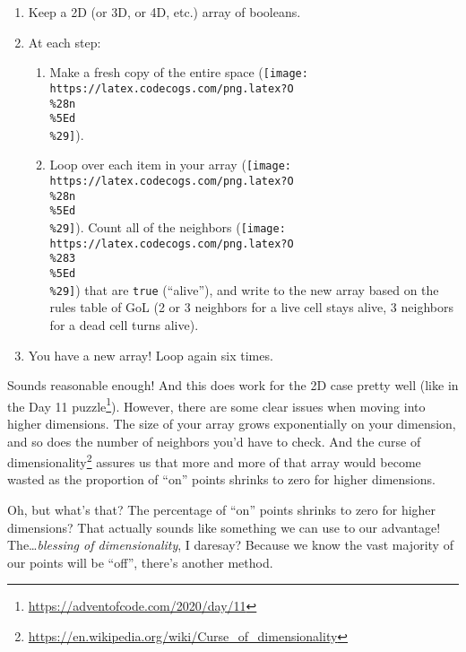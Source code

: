 \documentclass[]{article}
\renewcommand{\href}[2]{#2\footnote{\url{#1}}}
\begin{document}
\begin{enumerate}
\def\labelenumi{\arabic{enumi}.}
\tightlist
\item
  Keep a 2D (or 3D, or 4D, etc.) array of booleans.
\item
  At each step:

  \begin{enumerate}
  \def\labelenumii{\alph{enumii}.}
  \tightlist
  \item
    Make a fresh copy of the entire space
    (\texttt{[image: https://latex.codecogs.com/png.latex?O\\\%28n\\\%5Ed\\\%29]}).
  \item
    Loop over each item in your array
    (\texttt{[image: https://latex.codecogs.com/png.latex?O\\\%28n\\\%5Ed\\\%29]}).
    Count all of the neighbors
    (\texttt{[image: https://latex.codecogs.com/png.latex?O\\\%283\\\%5Ed\\\%29]})
    that are \texttt{true} (``alive''), and write to the new array based on the
    rules table of GoL (2 or 3 neighbors for a live cell stays alive, 3
    neighbors for a dead cell turns alive).
  \end{enumerate}
\item
  You have a new array! Loop again six times.
\end{enumerate}

Sounds reasonable enough! And this does work for the 2D case pretty well (like
in the \href{https://adventofcode.com/2020/day/11}{Day 11 puzzle}). However,
there are some clear issues when moving into higher dimensions. The size of your
array grows exponentially on your dimension, and so does the number of neighbors
you'd have to check. And the
\href{https://en.wikipedia.org/wiki/Curse_of_dimensionality}{curse of
dimensionality} assures us that more and more of that array would become wasted
as the proportion of ``on'' points shrinks to zero for higher dimensions.

Oh, but what's that? The percentage of ``on'' points shrinks to zero for higher
dimensions? That actually sounds like something we can use to our advantage!
The\ldots{}\emph{blessing of dimensionality}, I daresay? Because we know the
vast majority of our points will be ``off'', there's another method.
\end{document}
